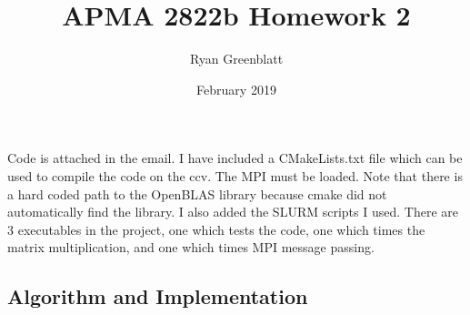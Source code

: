 \documentclass{article}
\title{APMA 2822b Homework 2}
\author{Ryan Greenblatt}
\date{February 2019}
\begin{document}
\setlength\parindent{0pt}

\renewcommand{\thesubsection}{\alph{subsection}}

\maketitle

\section{}

Code is attached in the email. I have included a CMakeLists.txt file which can be used to compile
the code on the ccv. The MPI must be loaded. Note that there is a hard coded path to the OpenBLAS library because
cmake did not automatically find the library. I also added the SLURM scripts I used.
There are 3 executables in the project, one which tests the code, one which times the matrix
multiplication, and one which times MPI message passing.

\subsection*{Algorithm and Implementation}
\end{document}
